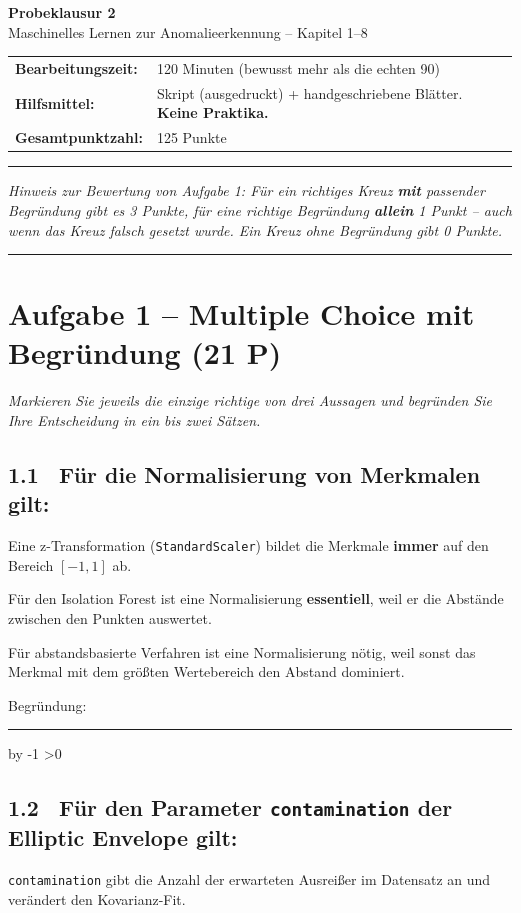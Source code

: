 \documentclass[10pt,a4paper]{article}
\newcommand{\mcbox}{\raisebox{-1pt}{\fbox{\rule{0pt}{7pt}\rule{7pt}{0pt}}}\hspace{6pt}}
\newcommand{\antwortlinien}[1]{%
  \par\vspace{2pt}%
  \newcount\zeilen \zeilen=#1
  \loop
    \noindent\rule{\linewidth}{0.4pt}\par\vspace{11pt}%
    \advance\zeilen by -1
  \ifnum\zeilen>0 \repeat
}
\newcommand{\pkt}[1]{\hfill\textbf{(#1 P)}}
\begin{document}
\begin{center}
  {\Large\bfseries Probeklausur 2}\\[4pt]
  {\large Maschinelles Lernen zur Anomalieerkennung -- Kapitel 1--8}\\[6pt]
  \begin{tabular}{@{}ll@{}}
  \textbf{Bearbeitungszeit:} & 120 Minuten (bewusst mehr als die echten 90)\\
  \textbf{Hilfsmittel:} & Skript (ausgedruckt) + handgeschriebene Blätter. \textbf{Keine Praktika.}\\
  \textbf{Gesamtpunktzahl:} & 125 Punkte\\
  \end{tabular}
\end{center}

\vspace{2pt}
\noindent\rule{\linewidth}{0.8pt}
\emph{Hinweis zur Bewertung von Aufgabe 1: Für ein richtiges Kreuz \textbf{mit} passender Begründung
gibt es 3 Punkte, für eine richtige Begründung \textbf{allein} 1 Punkt -- auch wenn das Kreuz falsch
gesetzt wurde. Ein Kreuz ohne Begründung gibt 0 Punkte.}

\noindent\rule{\linewidth}{0.8pt}

\section*{Aufgabe 1 -- Multiple Choice mit Begründung \pkt{21}}
\emph{Markieren Sie jeweils die einzige richtige von drei Aussagen und begründen Sie Ihre
Entscheidung in ein bis zwei Sätzen.}

\subsection*{1.1 \ Für die Normalisierung von Merkmalen gilt:}
\mcbox Eine z-Transformation (\texttt{StandardScaler}) bildet die Merkmale \textbf{immer} auf den
Bereich $[-1, 1]$ ab.

\mcbox Für den Isolation Forest ist eine Normalisierung \textbf{essentiell}, weil er die Abstände
zwischen den Punkten auswertet.

\mcbox Für abstandsbasierte Verfahren ist eine Normalisierung nötig, weil sonst das Merkmal mit
dem größten Wertebereich den Abstand dominiert.

Begründung:
\antwortlinien{2}

\subsection*{1.2 \ Für den Parameter \texttt{contamination} der Elliptic Envelope gilt:}
\mcbox \texttt{contamination} gibt die Anzahl der erwarteten Ausreißer im Datensatz an und
verändert den Kovarianz-Fit.
\end{document}
